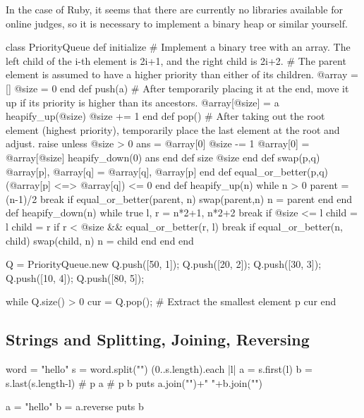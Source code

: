 In the case of Ruby, it seems that there are currently no libraries available for online judges, so it is necessary to implement a binary heap or similar yourself.
\begin{rbox}[emph={PriorityQueue,push,pop,size}]
class PriorityQueue
  def initialize
    # Implement a binary tree with an array. The left child of the i-th element is 2i+1, and the right child is 2i+2.
    # The parent element is assumed to have a higher priority than either of its children.
    @array = [] 
    @size = 0
  end
  def push(a)
    # After temporarily placing it at the end, move it up if its priority is higher than its ancestors.
    @array[@size] = a
    heapify_up(@size)
    @size += 1
  end
  def pop()
    # After taking out the root element (highest priority), temporarily place the last element at the root and adjust.
    raise unless @size > 0
    ans = @array[0]
    @size -= 1
    @array[0] = @array[@size]
    heapify_down(0)
    ans
  end
  def size
    @size
  end
  def swap(p,q) 
    @array[p],  @array[q] = @array[q], @array[p]
  end
  def equal_or_better(p,q)
    (@array[p] <=> @array[q]) <= 0
  end
  def heapify_up(n)
    while n > 0
      parent = (n-1)/2
      break if equal_or_better(parent, n)
      swap(parent,n)
      n = parent
    end
  end
  def heapify_down(n)
    while true
      l, r = n*2+1, n*2+2
      break if @size <= l
      child = l
      child = r if r < @size && equal_or_better(r, l)
      break if equal_or_better(n, child)
      swap(child, n)
      n = child
    end
  end
end

Q = PriorityQueue.new
Q.push([50, 1]);
Q.push([20, 2]);
Q.push([30, 3]);
Q.push([10, 4]);
Q.push([80, 5]);

while Q.size() > 0
  cur = Q.pop(); # Extract the smallest element
  p cur
end
\end{rbox}
\subsection{Strings and Splitting, Joining, Reversing}

\begin{rbox}
word = "hello"
s = word.split("")
(0..s.length).each {|l|
  a = s.first(l)
  b = s.last(s.length-l)
  # p a
  # p b
  puts a.join("")+" "+b.join("")
}  
\end{rbox}

\begin{rbox}
a = "hello"
b = a.reverse
puts b
\end{rbox}

